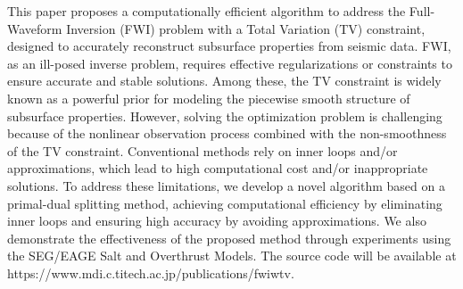 This paper proposes a computationally efficient algorithm to address the Full-Waveform Inversion (FWI) problem with a Total Variation (TV) constraint, designed to accurately reconstruct subsurface properties from seismic data.
FWI, as an ill-posed inverse problem, requires effective regularizations or constraints to ensure accurate and stable solutions.
Among these, the TV constraint is widely known as a powerful prior for modeling the piecewise smooth structure of subsurface properties.
However, solving the optimization problem is challenging because of the nonlinear observation process combined with the non-smoothness of the TV constraint.
Conventional methods rely on inner loops and/or approximations, which lead to high computational cost and/or inappropriate solutions.
To address these limitations, we develop a novel algorithm based on a primal-dual splitting method, achieving computational efficiency by eliminating inner loops and ensuring high accuracy by avoiding approximations.
We also demonstrate the effectiveness of the proposed method through experiments using the SEG/EAGE Salt and Overthrust Models.
The source code will be available at https://www.mdi.c.titech.ac.jp/publications/fwiwtv.
